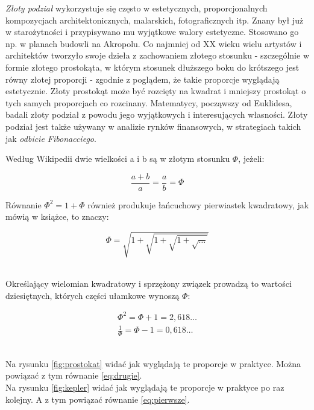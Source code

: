 \documentclass{article}
\begin{document}
\emph{Złoty podział} wykorzystuje się często w estetycznych, proporcjonalnych kompozycjach architektonicznych, malarskich, fotograficznych itp. Znany był już w starożytności i przypisywano mu wyjątkowe walory estetyczne. Stosowano go np. w planach budowli na Akropolu. Co najmniej od XX wieku wielu artystów i architektów tworzyło swoje dzieła z zachowaniem złotego stosunku - szczególnie w formie złotego prostokąta, w którym stosunek dłuższego boku do krótszego jest równy złotej proporcji - zgodnie z poglądem, że takie proporcje wyglądają estetycznie. Złoty prostokąt może być rozcięty na kwadrat i mniejszy prostokąt o tych samych proporcjach co rozcinany. Matematycy, począwszy od Euklidesa, badali złoty podział z powodu jego wyjątkowych i interesujących własności. Złoty podział jest także używany w analizie rynków finansowych, w strategiach takich jak \emph{odbicie Fibonacciego}.
\\
\begin{center}Według Wikipedii\cite{wk} dwie wielkości a i b są w złotym stosunku $\Phi$, jeżeli:\end{center}
\begin{equation}
\frac{a+b}{a} = \frac{a}{b} = \Phi
\label{eq:pierwsze}
\end{equation}
\begin{center} Równanie \begin{math} \Phi^{2} = 1 + \Phi \end{math} również produkuje łańcuchowy pierwiastek kwadratowy, jak mówią w książce\cite{ks}, to znaczy:\end{center}
\begin{equation}
\Phi = \sqrt{ 1+\sqrt{1+{\sqrt{1+{\sqrt{\ldots}}}}}}
\label{eq:drugie}
\end{equation}
\\
\begin{center}Określający wielomian kwadratowy i sprzężony związek prowadzą to wartości dziesiętnych, których części ułamkowe wynoszą $\Phi$:\end{center}
\begin{eqnarray}
\Phi^{2} = \Phi + 1 = 2,618\ldots
\\
\frac{1}{\Phi} = \Phi - 1 = 0,618\ldots
\end{eqnarray}
\\
\begin{flushright}
Na rysunku \ref{fig:prostokat} widać jak wyglądają te proporcje w praktyce. Można powiązać z tym równanie \ref{eq:drugie}.
\\
Na rysunku \ref{fig:kepler} widać jak wyglądają te proporcje w praktyce po raz kolejny. A z tym powiązać równanie \ref{eq:pierwsze}.
\end{flushright}
\end{document}
